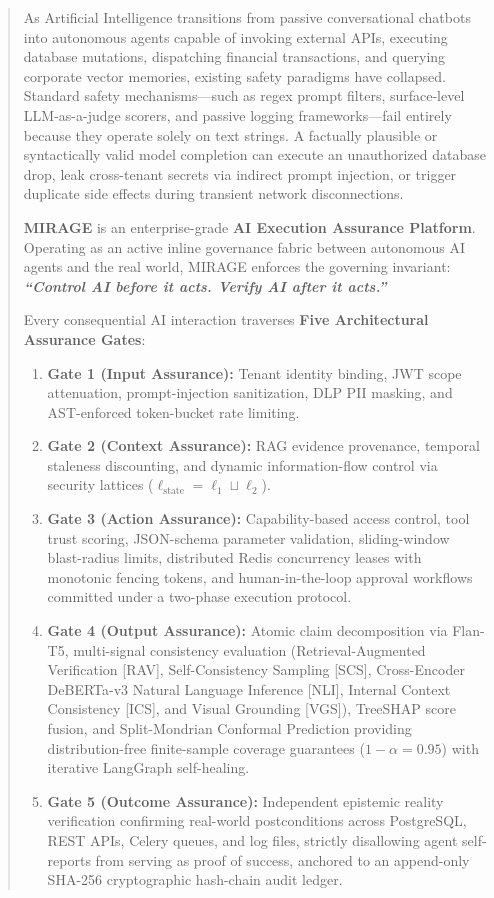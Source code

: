 \documentclass[11pt,a4paper]{article}
\begin{document}
\begin{abstract}
\noindent As Artificial Intelligence transitions from passive conversational chatbots into autonomous agents capable of invoking external APIs, executing database mutations, dispatching financial transactions, and querying corporate vector memories, existing safety paradigms have collapsed. Standard safety mechanisms---such as regex prompt filters, surface-level LLM-as-a-judge scorers, and passive logging frameworks---fail entirely because they operate solely on text strings. A factually plausible or syntactically valid model completion can execute an unauthorized database drop, leak cross-tenant secrets via indirect prompt injection, or trigger duplicate side effects during transient network disconnections.

\textbf{MIRAGE} is an enterprise-grade \textbf{AI Execution Assurance Platform}. Operating as an active inline governance fabric between autonomous AI agents and the real world, MIRAGE enforces the governing invariant: \textbf{\emph{``Control AI before it acts. Verify AI after it acts.''}}

Every consequential AI interaction traverses \textbf{Five Architectural Assurance Gates}:
\begin{enumerate}[leftmargin=*,itemsep=1pt]
  \item \textbf{Gate 1 (Input Assurance):} Tenant identity binding, JWT scope attenuation, prompt-injection sanitization, DLP PII masking, and AST-enforced token-bucket rate limiting.
  \item \textbf{Gate 2 (Context Assurance):} RAG evidence provenance, temporal staleness discounting, and dynamic information-flow control via security lattices ($\ell_{\text{state}} = \ell_1 \sqcup \ell_2$).
  \item \textbf{Gate 3 (Action Assurance):} Capability-based access control, tool trust scoring, JSON-schema parameter validation, sliding-window blast-radius limits, distributed Redis concurrency leases with monotonic fencing tokens, and human-in-the-loop approval workflows committed under a two-phase execution protocol.
  \item \textbf{Gate 4 (Output Assurance):} Atomic claim decomposition via Flan-T5, multi-signal consistency evaluation (Retrieval-Augmented Verification [RAV], Self-Consistency Sampling [SCS], Cross-Encoder DeBERTa-v3 Natural Language Inference [NLI], Internal Context Consistency [ICS], and Visual Grounding [VGS]), TreeSHAP score fusion, and Split-Mondrian Conformal Prediction providing distribution-free finite-sample coverage guarantees ($1-\alpha=0.95$) with iterative LangGraph self-healing.
  \item \textbf{Gate 5 (Outcome Assurance):} Independent epistemic reality verification confirming real-world postconditions across PostgreSQL, REST APIs, Celery queues, and log files, strictly disallowing agent self-reports from serving as proof of success, anchored to an append-only SHA-256 cryptographic hash-chain audit ledger.
\end{enumerate}


\end{abstract}
\end{document}
